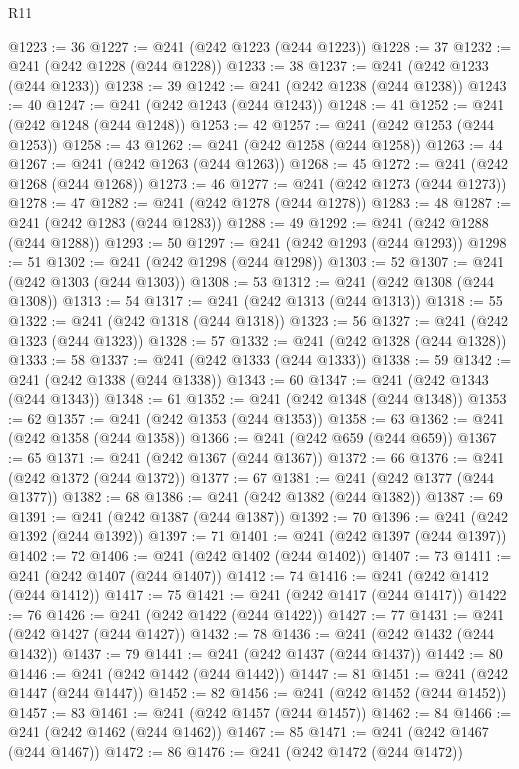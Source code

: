 \begin{lexlean}{R11}
\begin{coremodule}
@1223 := 36
@1227 := @241 (@242 @1223 (@244 @1223))
@1228 := 37
@1232 := @241 (@242 @1228 (@244 @1228))
@1233 := 38
@1237 := @241 (@242 @1233 (@244 @1233))
@1238 := 39
@1242 := @241 (@242 @1238 (@244 @1238))
@1243 := 40
@1247 := @241 (@242 @1243 (@244 @1243))
@1248 := 41
@1252 := @241 (@242 @1248 (@244 @1248))
@1253 := 42
@1257 := @241 (@242 @1253 (@244 @1253))
@1258 := 43
@1262 := @241 (@242 @1258 (@244 @1258))
@1263 := 44
@1267 := @241 (@242 @1263 (@244 @1263))
@1268 := 45
@1272 := @241 (@242 @1268 (@244 @1268))
@1273 := 46
@1277 := @241 (@242 @1273 (@244 @1273))
@1278 := 47
@1282 := @241 (@242 @1278 (@244 @1278))
@1283 := 48
@1287 := @241 (@242 @1283 (@244 @1283))
@1288 := 49
@1292 := @241 (@242 @1288 (@244 @1288))
@1293 := 50
@1297 := @241 (@242 @1293 (@244 @1293))
@1298 := 51
@1302 := @241 (@242 @1298 (@244 @1298))
@1303 := 52
@1307 := @241 (@242 @1303 (@244 @1303))
@1308 := 53
@1312 := @241 (@242 @1308 (@244 @1308))
@1313 := 54
@1317 := @241 (@242 @1313 (@244 @1313))
@1318 := 55
@1322 := @241 (@242 @1318 (@244 @1318))
@1323 := 56
@1327 := @241 (@242 @1323 (@244 @1323))
@1328 := 57
@1332 := @241 (@242 @1328 (@244 @1328))
@1333 := 58
@1337 := @241 (@242 @1333 (@244 @1333))
@1338 := 59
@1342 := @241 (@242 @1338 (@244 @1338))
@1343 := 60
@1347 := @241 (@242 @1343 (@244 @1343))
@1348 := 61
@1352 := @241 (@242 @1348 (@244 @1348))
@1353 := 62
@1357 := @241 (@242 @1353 (@244 @1353))
@1358 := 63
@1362 := @241 (@242 @1358 (@244 @1358))
@1366 := @241 (@242 @659 (@244 @659))
@1367 := 65
@1371 := @241 (@242 @1367 (@244 @1367))
@1372 := 66
@1376 := @241 (@242 @1372 (@244 @1372))
@1377 := 67
@1381 := @241 (@242 @1377 (@244 @1377))
@1382 := 68
@1386 := @241 (@242 @1382 (@244 @1382))
@1387 := 69
@1391 := @241 (@242 @1387 (@244 @1387))
@1392 := 70
@1396 := @241 (@242 @1392 (@244 @1392))
@1397 := 71
@1401 := @241 (@242 @1397 (@244 @1397))
@1402 := 72
@1406 := @241 (@242 @1402 (@244 @1402))
@1407 := 73
@1411 := @241 (@242 @1407 (@244 @1407))
@1412 := 74
@1416 := @241 (@242 @1412 (@244 @1412))
@1417 := 75
@1421 := @241 (@242 @1417 (@244 @1417))
@1422 := 76
@1426 := @241 (@242 @1422 (@244 @1422))
@1427 := 77
@1431 := @241 (@242 @1427 (@244 @1427))
@1432 := 78
@1436 := @241 (@242 @1432 (@244 @1432))
@1437 := 79
@1441 := @241 (@242 @1437 (@244 @1437))
@1442 := 80
@1446 := @241 (@242 @1442 (@244 @1442))
@1447 := 81
@1451 := @241 (@242 @1447 (@244 @1447))
@1452 := 82
@1456 := @241 (@242 @1452 (@244 @1452))
@1457 := 83
@1461 := @241 (@242 @1457 (@244 @1457))
@1462 := 84
@1466 := @241 (@242 @1462 (@244 @1462))
@1467 := 85
@1471 := @241 (@242 @1467 (@244 @1467))
@1472 := 86
@1476 := @241 (@242 @1472 (@244 @1472))

\end{coremodule}
\end{lexlean}

